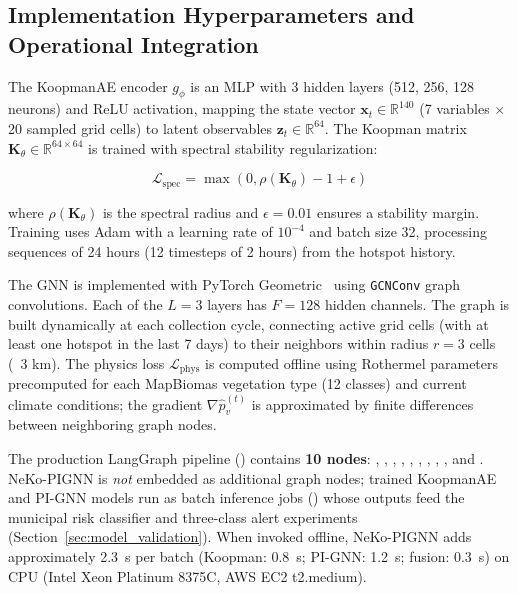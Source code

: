 \documentclass[preprint,12pt,times,numbers]{elsarticle}
\begin{document}
\subsection{Implementation Hyperparameters and Operational Integration}
\label{sec:impl-details}

The KoopmanAE encoder $g_\phi$ is an MLP with 3 hidden layers (512, 256, 128 neurons) and ReLU activation, mapping the state vector $\mathbf{x}_t \in \mathbb{R}^{140}$ (7 variables $\times$ 20 sampled grid cells) to latent observables $\mathbf{z}_t \in \mathbb{R}^{64}$. The Koopman matrix $\mathbf{K}_\theta \in \mathbb{R}^{64 \times 64}$ is trained with spectral stability regularization:

\begin{equation}
\mathcal{L}_{\text{spec}} = \max(0, \rho(\mathbf{K}_\theta) - 1 + \epsilon)
\label{eq:spectral_reg}
\end{equation}

where $\rho(\mathbf{K}_\theta)$ is the spectral radius and $\epsilon = 0.01$ ensures a stability margin. Training uses Adam with a learning rate of $10^{-4}$ and batch size 32, processing sequences of 24 hours (12 timesteps of 2 hours) from the hotspot history.

The GNN is implemented with PyTorch Geometric~\cite{article:pyg2019} using \texttt{GCNConv} graph convolutions. Each of the $L = 3$ layers has $F = 128$ hidden channels. The graph is built dynamically at each collection cycle, connecting active grid cells (with at least one hotspot in the last 7 days) to their neighbors within radius $r = 3$ cells (~3 km). The physics loss $\mathcal{L}_{\text{phys}}$ is computed offline using Rothermel parameters precomputed for each MapBiomas vegetation type (12 classes) and current climate conditions; the gradient $\nabla \hat{p}_v^{(t)}$ is approximated by finite differences between neighboring graph nodes.

The production LangGraph pipeline () contains \textbf{10 nodes}: , , , , , , , , , and . NeKo-PIGNN is \emph{not} embedded as additional graph nodes; trained KoopmanAE and PI-GNN models run as batch inference jobs () whose outputs feed the municipal risk classifier and three-class alert experiments (Section~\ref{sec:model_validation}). When invoked offline, NeKo-PIGNN adds approximately 2.3~s per batch (Koopman: 0.8~s; PI-GNN: 1.2~s; fusion: 0.3~s) on CPU (Intel Xeon Platinum 8375C, AWS EC2 t2.medium).
\end{document}
